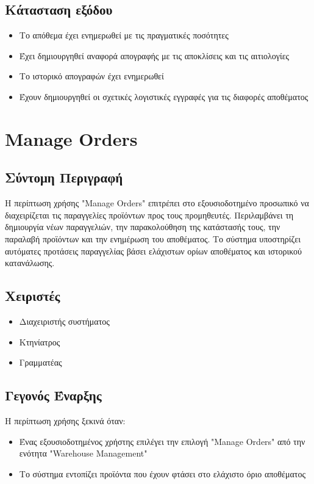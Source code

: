 \documentclass[12pt,a4paper,twoside]{book}
\begin{document}
\subsection{Κάτασταση εξόδου} %
\begin{itemize}
  \item Το απόθεμα έχει ενημερωθεί με τις πραγματικές ποσότητες
  \item Έχει δημιουργηθεί αναφορά απογραφής με τις αποκλίσεις και τις αιτιολογίες %
  \item Το ιστορικό απογραφών έχει ενημερωθεί
  \item Έχουν δημιουργηθεί οι σχετικές λογιστικές εγγραφές για τις διαφορές αποθέματος %
\end{itemize}

\section{Manage Orders}

\subsection{Σύντομη Περιγραφή}
Η περίπτωση χρήσης "Manage Orders" επιτρέπει στο εξουσιοδοτημένο προσωπικό να διαχειρίζεται τις παραγγελίες προϊόντων προς τους προμηθευτές. Περιλαμβάνει τη δημιουργία νέων παραγγελιών, την παρακολούθηση της κατάστασής τους, την παραλαβή προϊόντων και την ενημέρωση του αποθέματος. Το σύστημα υποστηρίζει αυτόματες προτάσεις παραγγελίας βάσει ελάχιστων ορίων αποθέματος και ιστορικού κατανάλωσης. %

\subsection{Χειριστές}
\begin{itemize}
  \item Διαχειριστής συστήματος
  \item Κτηνίατρος
  \item Γραμματέας
\end{itemize}

\subsection{Γεγονός Έναρξης}
Η περίπτωση χρήσης ξεκινά όταν:
\begin{itemize}
  \item Ένας εξουσιοδοτημένος χρήστης επιλέγει την επιλογή "Manage Orders" από την ενότητα "Warehouse Management" %
  \item Το σύστημα εντοπίζει προϊόντα που έχουν φτάσει στο ελάχιστο όριο αποθέματος
\end{itemize}
\end{document}
